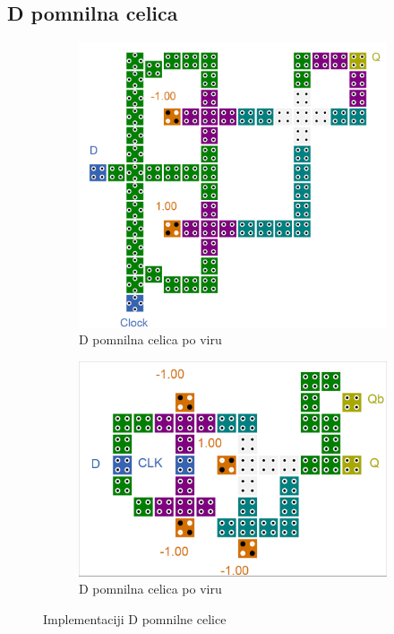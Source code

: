 \documentclass[a4paper, 11pt]{article}
\begin{document}
\subsection{D pomnilna celica}
\begin{figure}[h!]
	\begin{subfigure}[b]{0.4\textwidth}
	\includegraphics[width=\textwidth]{../img/vir_4/d.png}
	\caption{D pomnilna celica po viru \cite{quantum_dot}}
	\label{fig-d-1}
	\end{subfigure}
	\begin{subfigure}[b]{0.4\textwidth}
	\includegraphics[width=\textwidth]{../img/vir_5/d.png} 
	\caption{D pomnilna celica po viru \cite{a_novel_approach}}
	\label{fig-d-2}
	\end{subfigure}
	\caption{Implementaciji D pomnilne celice}
	\label{fig-d}
\end{figure}
\end{document}
